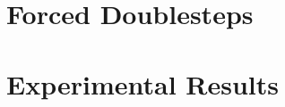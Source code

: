\documentclass[10pt]{sigplanconf}
\begin{document}

\section{Forced Doublesteps}


\section{Experimental Results}


\end{document}
